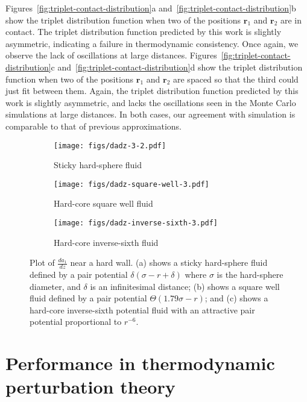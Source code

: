 \documentclass[letterpaper,twocolumn,amsmath,amssymb,pre,aps,10pt]{revtex4-1}
\newcommand{\rr}{\textbf{r}}
\begin{document}
Figures~\ref{fig:triplet-contact-distribution}a
and~\ref{fig:triplet-contact-distribution}b show the triplet
distribution
function when two of the positions $\rr_1$ and $\rr_2$ are in contact.
The triplet distribution function predicted by this work is slightly
asymmetric, indicating a failure in thermodynamic consistency.  Once
again, we observe the lack of oscillations at large distances.
Figures~\ref{fig:triplet-contact-distribution}c
and~\ref{fig:triplet-contact-distribution}d show the triplet distribution
function when two of the positions $\rr_1$ and $\rr_2$ are spaced so
that the third could just fit between them.  Again, the triplet
distribution function predicted by this work is slightly asymmetric,
and lacks the oscillations seen in the Monte Carlo simulations at
large distances.  In both cases, our agreement with simulation is
comparable to that of previous approximations.

\begin{figure}
  \begin{subfigure}{1.0\columnwidth}
    \texttt{[image: figs/dadz-3-2.pdf]}
    \vspace{-0.8cm}
    \caption{Sticky hard-sphere fluid}\label{fig:dadz-delta}
  \end{subfigure}
  \begin{subfigure}{1.0\columnwidth}
    \texttt{[image: figs/dadz-square-well-3.pdf]}
    \vspace{-0.8cm}
    \caption{Hard-core square well fluid}\label{fig:dadz-square-well}
  \end{subfigure}
  \begin{subfigure}{1.0\columnwidth}
    \texttt{[image: figs/dadz-inverse-sixth-3.pdf]}
    \vspace{-0.8cm}
    \caption{Hard-core inverse-sixth fluid}\label{fig:dadz-inverse-sixth}
  \end{subfigure}
  \caption{Plot of $\frac{da_1}{dz}$ near a hard wall.  (a) shows a
    sticky hard-sphere fluid defined by a pair potential
    $\delta(\sigma-r+\delta)$ where $\sigma$ is the hard-sphere
    diameter, and $\delta$ is an infinitesimal distance; (b) shows a
    square well fluid defined by a pair potential $\Theta(1.79
    \sigma-r)$; and (c) shows a hard-core inverse-sixth potential
    fluid with an attractive pair potential proportional to $r^{-6}$.
  }
  \label{fig:dadz}
\end{figure}

\section{Performance in thermodynamic perturbation theory}
\end{document}
